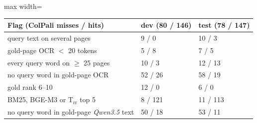 \begin{adjustbox}{max width=\linewidth}
\begin{tabular}{lll}
\toprule
Flag (ColPali misses / hits) & dev (80 / 146) & test (78 / 147) \\
\midrule
query text on several pages & 9 / 0 & 10 / 3 \\
gold-page OCR $<$ 20 tokens & 5 / 8 & 7 / 5 \\
every query word on $\geq$ 25 pages & 10 / 3 & 12 / 13 \\
no query word in gold-page OCR & 52 / 26 & 58 / 19 \\
gold rank 6--10 & 12 / 0 & 6 / 0 \\
BM25, BGE-M3 or T$_\text{rr}$ top 5 & 8 / 121 & 11 / 113 \\
\midrule no query word in gold-page \emph{Qwen3.5} text & 50 / 18 & 53 / 11 \\
\bottomrule
\end{tabular}
\end{adjustbox}
\par{}
